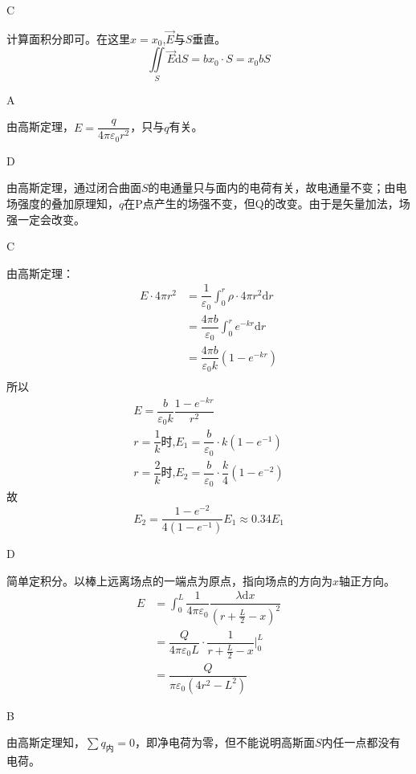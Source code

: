\documentclass[b5paper,opensource,sourcefont,parskip]{qyxf-book}
\newcommand{\di}[1]{\mathrm{d}#1}
\begin{document}
C

\solve
计算面积分即可。在这里$x=x_0$,$\vec{E}$与$S$垂直。
\begin{equation*}
\iint\limits_S \vec{E}\di{S}=bx_0\cdot S=x_0bS
\end{equation*}

A

\solve
由高斯定理，$E=\dfrac{q}{4\pi\varepsilon_0 r^2}$，只与$q$有关。

D

\solve
由高斯定理，通过闭合曲面$S$的电通量只与面内的电荷有关，故电通量不变；由电场强度的叠加原理知，$q$在P点产生的场强不变，但Q的改变。由于是矢量加法，场强一定会改变。

C

\solve
由高斯定理：
\begin{align*}
E\cdot 4\pi r^2&=\dfrac{1}{\varepsilon_0}\int_0^r\rho\cdot 4\pi r^2\di{r}\\
&=\dfrac{4\pi b}{\varepsilon_0}\int_0^r e^{-kr}\di{r}\\
&=\dfrac{4\pi b}{\varepsilon_0 k}(1-e^{-kr})\\
\end{align*}
所以
\begin{gather*}
E=\dfrac{b}{\varepsilon_0 k}\dfrac{1-e^{-kr}}{r^2}\\
r=\dfrac{1}{k}\text{时,}E_1=\dfrac{b}{\varepsilon_0}\cdot k(1-e^{-1})\\
r=\dfrac{2}{k}\text{时,}E_2=\dfrac{b}{\varepsilon_0}\cdot \dfrac{k}{4}(1-e^{-2})
\end{gather*}
故
\begin{equation*}
E_2=\dfrac{1-e^{-2}}{4(1-e^{-1})}E_1\approx 0.34E_1
\end{equation*}

D

\solve
简单定积分。以棒上远离场点的一端点为原点，指向场点的方向为$x$轴正方向。
\begin{align*}
E&=\int_{0}^{L}\dfrac{1}{4\pi \varepsilon_0}\dfrac{\lambda\di{x}}{{(r+\frac{L}{2}-x)}^2}\\
&=\dfrac{Q}{4\pi \varepsilon_0 L}\cdot \dfrac{1}{{r+\frac{L}{2}-x}}\bigg|_0^L\\
&=\dfrac{Q}{\pi \varepsilon_0(4r^2-L^2)}
\end{align*}

B

\solve
由高斯定理知，$\sum q_{\text{内}}=0$，即净电荷为零，但不能说明高斯面$S$内任一点都没有电荷。
\end{document}
